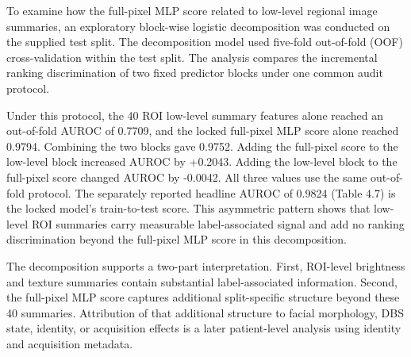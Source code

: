 To examine how the full-pixel MLP score related to low-level regional image summaries, an exploratory block-wise logistic decomposition was conducted on the supplied test split. The decomposition model used five-fold out-of-fold (OOF) cross-validation within the test split. The analysis compares the incremental ranking discrimination of two fixed predictor blocks under one common audit protocol.

Under this protocol, the 40 ROI low-level summary features alone reached an out-of-fold AUROC of 0.7709, and the locked full-pixel MLP score alone reached 0.9794. Combining the two blocks gave 0.9752. Adding the full-pixel score to the low-level block increased AUROC by +0.2043. Adding the low-level block to the full-pixel score changed AUROC by -0.0042. All three values use the same out-of-fold protocol. The separately reported headline AUROC of 0.9824 (Table 4.7) is the locked model's train-to-test score. This asymmetric pattern shows that low-level ROI summaries carry measurable label-associated signal and add no ranking discrimination beyond the full-pixel MLP score in this decomposition.

The decomposition supports a two-part interpretation. First, ROI-level brightness and texture summaries contain substantial label-associated information. Second, the full-pixel MLP score captures additional split-specific structure beyond these 40 summaries. Attribution of that additional structure to facial morphology, DBS state, identity, or acquisition effects is a later patient-level analysis using identity and acquisition metadata.


